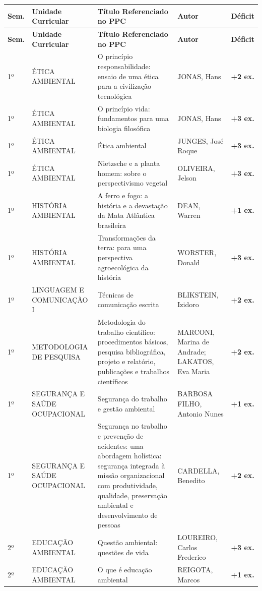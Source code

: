 \documentclass[11pt,a4paper]{article}
\begin{document}
\begin{longtable}{|p{1.2cm}|p{3.5cm}|p{6cm}|p{3.5cm}|c|}
\hline
\textbf{Sem.} & \textbf{Unidade Curricular} & \textbf{Título Referenciado no PPC} & \textbf{Autor} & \textbf{Déficit} \\ \hline
\endfirsthead
\hline
\textbf{Sem.} & \textbf{Unidade Curricular} & \textbf{Título Referenciado no PPC} & \textbf{Autor} & \textbf{Déficit} \\ \hline
\endhead
1º & ÉTICA AMBIENTAL & O princípio responsabilidade: ensaio de uma ética para a civilização tecnológica & JONAS, Hans & \textbf{+2 ex.} \\ \hline
1º & ÉTICA AMBIENTAL & O princípio vida: fundamentos para uma biologia filosófica & JONAS, Hans & \textbf{+3 ex.} \\ \hline
1º & ÉTICA AMBIENTAL & Ética ambiental & JUNGES, José Roque & \textbf{+3 ex.} \\ \hline
1º & ÉTICA AMBIENTAL & Nietzsche e a planta homem: sobre o perspectivismo vegetal & OLIVEIRA, Jelson & \textbf{+3 ex.} \\ \hline
1º & HISTÓRIA AMBIENTAL & A ferro e fogo: a história e a devastação da Mata Atlântica brasileira & DEAN, Warren & \textbf{+1 ex.} \\ \hline
1º & HISTÓRIA AMBIENTAL & Transformações da terra: para uma perspectiva agroecológica da história & WORSTER, Donald & \textbf{+3 ex.} \\ \hline
1º & LINGUAGEM E COMUNICAÇÃO I & Técnicas de comunicação escrita & BLIKSTEIN, Izidoro & \textbf{+2 ex.} \\ \hline
1º & METODOLOGIA DE PESQUISA & Metodologia do trabalho científico: procedimentos básicos, pesquisa bibliográfica, projeto e relatório, publicações e trabalhos científicos & MARCONI, Marina de Andrade; LAKATOS, Eva Maria & \textbf{+2 ex.} \\ \hline
1º & SEGURANÇA E SAÚDE OCUPACIONAL & Segurança do trabalho e gestão ambiental & BARBOSA FILHO, Antonio Nunes & \textbf{+1 ex.} \\ \hline
1º & SEGURANÇA E SAÚDE OCUPACIONAL & Segurança no trabalho e prevenção de acidentes: uma abordagem holística: segurança integrada à missão organizacional com produtividade, qualidade, preservação ambiental e desenvolvimento de pessoas & CARDELLA, Benedito & \textbf{+2 ex.} \\ \hline
2º & EDUCAÇÃO AMBIENTAL & Questão ambiental: questões de vida & LOUREIRO, Carlos Frederico & \textbf{+3 ex.} \\ \hline
2º & EDUCAÇÃO AMBIENTAL & O que é educação ambiental & REIGOTA, Marcos & \textbf{+1 ex.} \\ \hline

\end{longtable}
\end{document}

